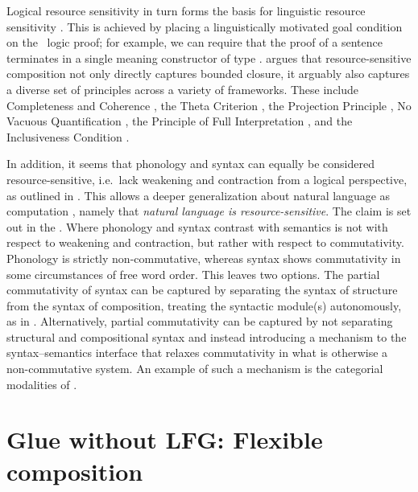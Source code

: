 \documentclass[output=paper,hidelinks]{langscibook}
\begin{document}
Logical resource sensitivity in turn forms the basis for linguistic
resource sensitivity \citep[ch.\,4]{Asudeh12}. This is achieved by
 placing a linguistically motivated goal condition on the \glue\
logic proof; for example, we can require that the proof of a sentence
terminates in a single meaning constructor of type \aterm{t}
\citep{dalrymple;ea99c}. \citet[110--123]{Asudeh12} argues that
resource-sensitive composition not only directly captures bounded
closure, it arguably also captures a diverse set of principles across
a variety of frameworks. These include Completeness and Coherence
\citep{kaplanbresnan82}, the Theta Criterion \citep{chomsky1981lectures}, the
Projection Principle \citep{chomsky1981lectures,chomsky1982some,chomsky86a}, No
Vacuous Quantification
\citep{chomsky1982some,chomsky1995the-minimalist,kratzer95,kennedy97,heim1998semantics,fox00},
the Principle of Full Interpretation \citep{chomsky86a,chomsky1995the-minimalist}, and
the Inclusiveness Condition \citep{chomsky1995the-minimalist}.

\largerpage
In addition, it seems that phonology and syntax can equally be
considered resource-sensitive, i.e.\ lack weakening and contraction
from a logical perspective, as outlined in
\citet[98--99]{Asudeh12}. This allows a deeper generalization
about natural language as computation \citep{steedman07}, namely that
\emph{natural language is resource-sensitive}. The claim is set out in
the \aterm{Resource Sensitivity Hypothesis}
\citep[95]{Asudeh12}. Where phonology and syntax contrast with
semantics is not with respect to weakening and contraction, but rather
with respect to commutativity. Phonology is strictly non-commutative,
whereas syntax shows commutativity in some circumstances of free word
order. This leaves two options. The partial commutativity of syntax
can be captured by separating the syntax of structure from the
syntax of composition, treating the syntactic module(s) autonomously, as in
\glues. Alternatively, partial commutativity can be captured by not
separating structural and compositional syntax  and instead  introducing a mechanism to the syntax--semantics
interface that relaxes commutativity in what is otherwise a
non-commutative system. An example of such a mechanism is the
categorial modalities of \citet{baldridge02}.



\section{Glue without LFG: Flexible composition}
\label{sec:general-glue}
\end{document}
